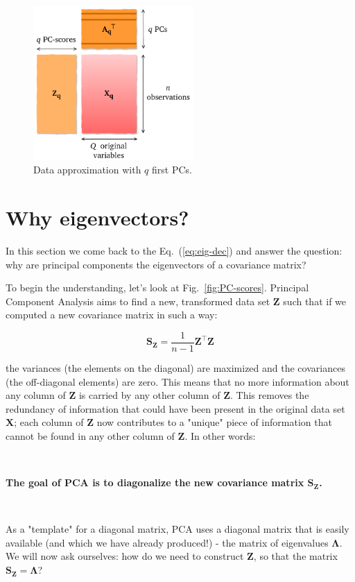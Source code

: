 \documentclass[10pt,twocolumn]{article}
\begin{document}
\begin{figure}[H]
\centering\includegraphics[width=6.1cm]{data-approx.pdf}
\caption{Data approximation with $q$ first PCs.}
\label{fig:data-approx}
\end{figure}

\section{Why eigenvectors?}

In this section we come back to the Eq.~(\ref{eq:eig-dec}) and answer the question: why are principal components the eigenvectors of a covariance matrix? 

To begin the understanding, let's look at Fig.~\ref{fig:PC-scores}. Principal Component Analysis aims to find a new, transformed data set $\mathbf{Z}$ such that if we computed a new covariance matrix in such a way:

\begin{equation}
\mathbf{S_Z} =  \frac{1}{n-1} \mathbf{Z}^{\top} \mathbf{Z}
\end{equation}

the variances (the elements on the diagonal) are maximized and the covariances (the off-diagonal elements) are zero. This means that no more information about any column of $\mathbf{Z}$ is carried by any other column of $\mathbf{Z}$. This removes the redundancy of information that could have been present in the original data set $\mathbf{X}$; each column of $\mathbf{Z}$ now contributes to a "unique" piece of information that cannot be found in any other column of $\mathbf{Z}$. In other words:

\,\,

\textbf{The goal of PCA is to diagonalize the new covariance matrix $\mathbf{S_Z}$.}

\,\,

As a "template" for a diagonal matrix, PCA uses a diagonal matrix that is easily available (and which we have already produced!) - the matrix of eigenvalues $\mathbf{\Lambda}$. We will now ask ourselves: how do we need to construct $\mathbf{Z}$, so that the matrix $\mathbf{S_Z} = \mathbf{\Lambda}$?
\end{document}
